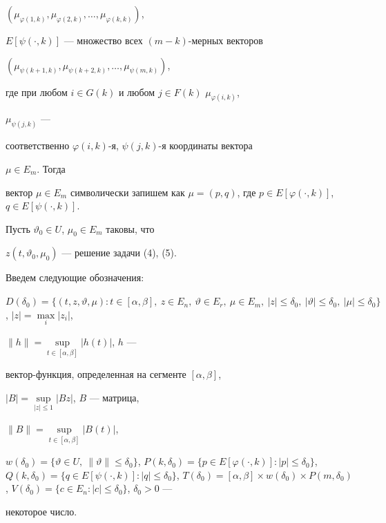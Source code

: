 $(\mu_{\varphi(1,k)},\mu_{\varphi(2,k)},\dotsc,\mu_{\varphi(k,k)})$, 


$E[\psi(\cdot,k)]$ --- множество всех $(m-k)$-мерных векторов 


$(\mu_{\psi(k+1,k)},\mu_{\psi(k+2,k)},\dotsc,\mu_{\psi(m,k)})$, 


где при любом $i\in G(k)$ и любом $j\in F(k)$\; $\mu_{\varphi(i,k)}$, 


$\mu_{\psi(j,k)}$ --- 


соответственно $\varphi(i,k)$-я, $\psi(j,k)$-я координаты вектора 


$\mu\in E_m$. Тогда 


вектор $\mu\in E_m$ символически запишем как $\mu=(p,q)$, где $p\in 


E[\varphi(\cdot,k)]$, $q\in E[\psi(\cdot,k)]$. 


 


Пусть $\vartheta_0\in U$, $\mu_0\in E_m$ таковы, что 


$z(t,\vartheta_0,\mu_0)$ --- решение задачи (4), (5). 


Введем следующие обозначения: 


$D(\delta_0)=\{(t,z,\vartheta,\mu):t\in[\alpha,\beta],\ z\in E_n,\ 


\vartheta\in E_r,\ \mu\in E_m,\ |z|\le\delta_0,\ 


|\vartheta|\le\delta_0,\ |\mu|\le\delta_0\}$, $|z|=\max\limits_i|z_i|$, 


$\|h\|=\sup\limits_{t\in[\alpha,\beta]}|h(t)|$, $h$ --- 


вектор-функция, определенная на сегменте $[\alpha,\beta]$, 


$|B|=\sup\limits_{|z|\le1}|B{}z|$, $B$ --- матрица, 


$\|B\|=\sup\limits_{t\in[\alpha,\beta]}|B(t)|$,


$w(\delta_0)=\{\vartheta\in 


U,\ \|\vartheta\|\le\delta_0\}$, $P(k,\delta_0)=\{p\in 


E[\varphi(\cdot,k)]:|p|\le\delta_0\}$, $Q(k,\delta_0)=\{q\in 


E[\psi(\cdot,k)]:|q|\le\delta_0\}$, $T(\delta_0)=[\alpha,\beta]\times 


w(\delta_0)\times P(m,\delta_0)$, $V(\delta_0)=\{c\in 


E_n:|c|\le\delta_0\}$, $\delta_0>0$ --- 


некоторое число. 


 


